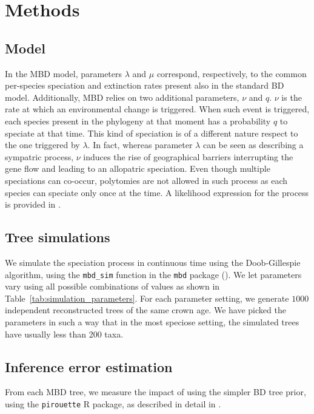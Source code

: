 \section{Methods}

\subsection{Model}

In the MBD model, parameters $\lambda$ and $\mu$ correspond, respectively, 
to the common per-species speciation and extinction rates present 
also in the standard BD model. 
Additionally, MBD relies on two additional parameters, $\nu$ and $q$. 
$\nu$ is the rate at which an environmental change is triggered.
When such event is triggered, each species present in the phylogeny at that 
moment has a probability $q$ to speciate at that time.
This kind of speciation is of a different nature respect to the one triggered 
by $\lambda$. In fact, whereas parameter $\lambda$ can be seen as describing 
a sympatric process, $\nu$ induces the rise of geographical barriers 
interrupting the gene flow and leading to an allopatric speciation.
Even though multiple speciations can co-occur, polytomies are not allowed 
in such process as each species can speciate only once at the time.
A likelihood expression for the process is provided in \cite{mbd}.

\subsection{Tree simulations}

We simulate the speciation process in continuous time using the 
Doob-Gillespie algorithm, using 
the \verb;mbd_sim; function in the \verb;mbd; package (\citep{mbd}).
We let parameters vary using all possible combinations of values
as shown in Table~\ref{tab:simulation_parameters}.
For each parameter setting, we generate $1000$ independent 
reconstructed trees of the same crown age.
We have picked the parameters in such a way that in the most speciose
setting, the simulated trees have usually less than 200 taxa.

\subsection{Inference error estimation}

From each MBD tree, we measure the impact 
of using the simpler BD tree prior, 
using the \verb;pirouette; R package, as described
in detail in \citep{pirouette}.

